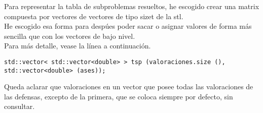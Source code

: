 Para representar la tabla de subproblemas resueltos, he escogido crear
una matrix compuesta por vectores de vectores de tipo sizet de la stl.\\

He escogido esa forma para despúes poder sacar o asignar valores de forma
más sencilla que con los vectores de bajo nivel.\\

Para más detalle, vease la línea a continuación.\\


\lstset{language=C++, texcl=true}
\begin{lstlisting}[frame=single]
    std::vector< std::vector<double> > tsp (valoraciones.size (), std::vector<double> (ases));
\end{lstlisting}

Queda aclarar que valoraciones en un vector que posee todas las valoraciones de las defensas,
excepto de la primera, que se coloca siempre por defecto, sin consultar.\\
